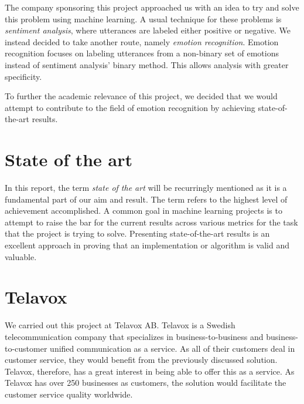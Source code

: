 \documentclass[nofilelist]{cslthse-msc}
\begin{document}
The company sponsoring this project approached us with an idea to try and solve this problem using machine learning. A usual technique for these problems is \textit{sentiment analysis}, where utterances are labeled either positive or negative. We instead decided to take another route, namely \textit{emotion recognition}. Emotion recognition focuses on labeling utterances from a non-binary set of emotions instead of sentiment analysis' binary method. This allows analysis with greater specificity.  

To further the academic relevance of this project, we decided that we would attempt to contribute to the field of emotion recognition by achieving state-of-the-art results. 

\section{State of the art}

In this report, the term \emph{state of the art} will be recurringly mentioned as it is a fundamental part of our aim and result. The term refers to the highest level of achievement accomplished. A common goal in machine learning projects is to attempt to raise the bar for the current
results across various metrics for the task that the project is trying to solve. Presenting state-of-the-art results is an excellent approach in proving that an implementation or algorithm is valid and valuable.   




\section{Telavox}
We carried out this project at Telavox AB. Telavox is a Swedish telecommunication company that specializes in business-to-business and business-to-customer unified communication as a service. As all of their customers deal in customer service, they would benefit from the previously discussed solution. Telavox, therefore, has a great interest in being able to offer this as a service. As Telavox has over 250 businesses as customers, the solution would facilitate the customer service quality worldwide.
\end{document}
